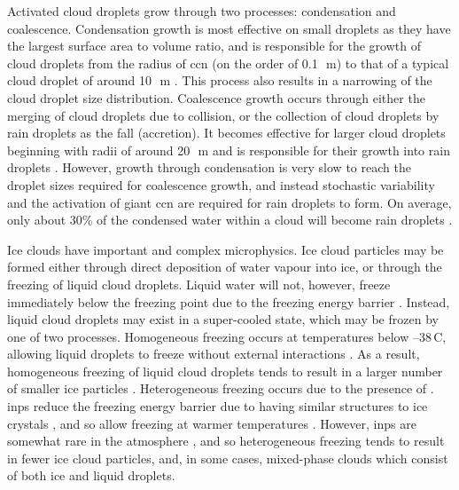 Activated cloud droplets grow through two processes: condensation and coalescence. 
Condensation growth is most effective on small droplets as they have the largest surface area to volume ratio, and is responsible for the growth of cloud droplets from the radius of \acrshort{ccn} (on the order of 0.1\,\unit{\mu m}) to that of a typical cloud droplet of around 10\,\unit{\mu m} \citep{cloud_physics}. 
This process also results in a narrowing of the cloud droplet size distribution. 
Coalescence growth occurs through either the merging of cloud droplets due to collision, or the collection of cloud droplets by rain droplets as the fall (accretion).
It becomes effective for larger cloud droplets beginning with radii of around 20\,\unit{\mu m} and is responsible for their growth into rain droplets \citep{cloud_physics}.
However, growth through condensation is very slow to reach the droplet sizes required for coalescence growth, and instead stochastic variability and the activation of giant \acrshort{ccn} \citep{feingold_impact_1999} are required for rain droplets to form. 
On average, only about 30\% of the condensed water within a cloud will become rain droplets \citep{trenberth_changing_2003}.

Ice clouds have important and complex microphysics.
Ice cloud particles may be formed either through direct deposition of water vapour into ice, or through the freezing of liquid cloud droplets.
Liquid water will not, however, freeze immediately below the freezing point due to the freezing energy barrier \citep{heymsfield_homogeneous_1993}.
Instead, liquid cloud droplets may exist in a super-cooled state, which may be frozen by one of two processes.
Homogeneous freezing occurs at temperatures below --38\,\textdegree C, allowing liquid droplets to freeze without external interactions \citep{koop_water_2000}.
As a result, homogeneous freezing of liquid cloud droplets tends to result in a larger number of smaller ice particles \citep{karcher_parameterization_2002, ickes_classical_2015}.
Heterogeneous freezing occurs due to the presence of  \citep{kanji_overview_2017a}.
\acrshort{inp}s reduce the freezing energy barrier due to having similar structures to ice crystals \citep{hoose_heterogeneous_2012}, and so allow freezing at warmer temperatures \citep{karcher_roles_2003}.
However, \acrshort{inp}s are somewhat rare in the atmosphere \citep{burrows_icenucleating_2022a}, and so heterogeneous freezing tends to result in fewer ice cloud particles, and, in some cases, mixed-phase clouds which consist of both ice and liquid droplets.

